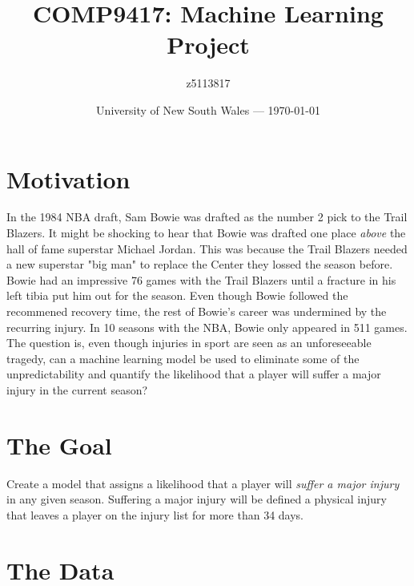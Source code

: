 \documentclass{article}
\title{COMP9417: Machine Learning Project} %
\author{z5113817} %
\date{University of New South Wales --- \today} %
\newcommand{\injurydef}{a physical injury that leaves a player on the injury list for more than 34 days}
\begin{document}
\maketitle %



\section*{Motivation}

In the 1984 NBA draft, Sam Bowie was drafted as the number 2 pick to the Trail Blazers.
It might be shocking to hear that Bowie was drafted one place \emph{above} the hall of fame superstar Michael Jordan.
This was because the Trail Blazers needed a new superstar "big man" to replace the Center they lossed the season before.
Bowie had an impressive 76 games with the Trail Blazers until a fracture in his left tibia put him out for the season.
Even though Bowie followed the recommened recovery time, the rest of Bowie's career was undermined by the recurring injury.
In 10 seasons with the NBA, Bowie only appeared in 511 games.\\

The question is, even though injuries in sport are seen as an unforeseeable tragedy, can a
machine learning model be used to eliminate some of the unpredictability and quantify
the likelihood that a player will suffer a major injury in the current season?

\section*{The Goal}

Create a model that assigns a likelihood that a player will \emph{suffer a major injury}
in any given season. Suffering a major injury will be defined \injurydef.

\newpage


\section*{The Data}
\end{document}
